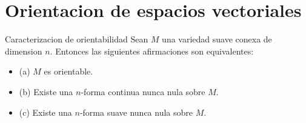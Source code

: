 \section{Orientacion de espacios vectoriales}
\begin{bookproposition}{Caracterizacion de orientabilidad}
Sean $M$ una variedad suave conexa de dimension $n$. Entonces las siguientes afirmaciones son equivalentes:

\begin{itemize}
\item (a) $M$ es orientable.
\item (b) Existe una $n$-forma continua nunca nula sobre $M$.
\item (c) Existe una $n$-forma suave nunca nula sobre $M$.
\end{itemize}
\end{bookproposition}
